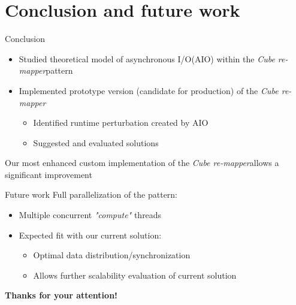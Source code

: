 \documentclass[slidestop,xcolor=dvipsnames, notes=hide]{beamer}
\newcommand{\toolTargetSoftware}			{\emph{Cube re-mapper}}
\newcommand{\notationIO}					{I/O}
\newcommand{\notationaio}					{asynchronous \notationIO}
\begin{document}
\section{Conclusion and future work}
	\begin{frame}[c]{Conclusion}
		\begin{itemize}
			\item Studied theoretical model of \notationaio\space (AIO) within the \toolTargetSoftware\space pattern
			\pause
			\item Implemented prototype version (candidate for production) of the \toolTargetSoftware\space
			\pause
			\begin{itemize}
				\item Identified runtime perturbation created by AIO
				\item Suggested and evaluated solutions
			\end{itemize}
		\end{itemize}

		\pause
		Our most enhanced custom implementation of the \toolTargetSoftware\space allows a significant improvement
	\end{frame}


	\begin{frame}[c]{Future work}
		Full parallelization of the pattern:
		\begin{itemize}
			\item Multiple concurrent \emph{"compute"} threads
			\item Expected fit with our current solution:
			\begin{itemize}
				\item Optimal data distribution/synchronization
				\item Allows further scalability evaluation of current solution
			\end{itemize}
		\end{itemize}
	\end{frame}


\begin{frame}
\vspace{1cm} 
\begin{center}
\huge{\textbf{Thanks for your attention!}}
\end{center}
\end{frame}





	
\end{document}
